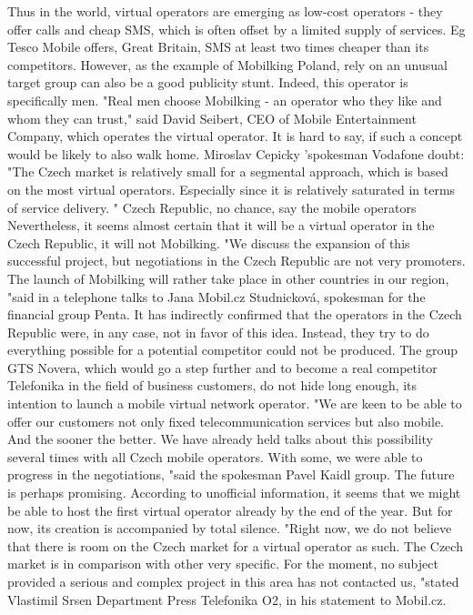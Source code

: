 Thus in the world, virtual operators are emerging as low-cost operators - they offer calls and cheap SMS, which is often offset by a limited supply of services.
Eg Tesco Mobile offers, Great Britain, SMS at least two times cheaper than its competitors.
However, as the example of Mobilking Poland, rely on an unusual target group can also be a good publicity stunt.
Indeed, this operator is specifically men.
"Real men choose Mobilking - an operator who they like and whom they can trust," said David Seibert, CEO of Mobile Entertainment Company, which operates the virtual operator.
It is hard to say, if such a concept would be likely to also walk home.
Miroslav Cepicky 'spokesman Vodafone doubt: "The Czech market is relatively small for a segmental approach, which is based on the most virtual operators.
Especially since it is relatively saturated in terms of service delivery. "
Czech Republic, no chance, say the mobile operators
Nevertheless, it seems almost certain that it will be a virtual operator in the Czech Republic, it will not Mobilking.
"We discuss the expansion of this successful project, but negotiations in the Czech Republic are not very promoters.
The launch of Mobilking will rather take place in other countries in our region, "said in a telephone talks to Jana Mobil.cz Studnicková, spokesman for the financial group Penta.
It has indirectly confirmed that the operators in the Czech Republic were, in any case, not in favor of this idea.
Instead, they try to do everything possible for a potential competitor could not be produced.
The group GTS Novera, which would go a step further and to become a real competitor Telefonika in the field of business customers, do not hide long enough, its intention to launch a mobile virtual network operator.
"We are keen to be able to offer our customers not only fixed telecommunication services but also mobile.
And the sooner the better.
We have already held talks about this possibility several times with all Czech mobile operators.
With some, we were able to progress in the negotiations, "said the spokesman Pavel Kaidl group.
The future is perhaps promising.
According to unofficial information, it seems that we might be able to host the first virtual operator already by the end of the year.
But for now, its creation is accompanied by total silence.
"Right now, we do not believe that there is room on the Czech market for a virtual operator as such.
The Czech market is in comparison with other very specific.
For the moment, no subject provided a serious and complex project in this area has not contacted us, "stated Vlastimil Srsen Department Press Telefonika O2, in his statement to Mobil.cz.
